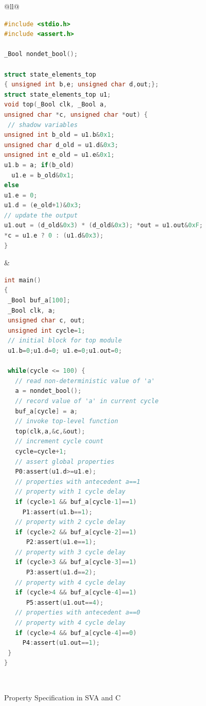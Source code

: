 \begin{figure}[bth]
\small
\begin{center}
\begin{tabular}{@{}ll@{}}
\hline\noalign{\vskip0.25ex}
 \\
\hline
\begin{lstlisting}[boxpos=t,mathescape=true,language=C,basicstyle=\scriptsize\ttfamily]
#include <stdio.h>
#include <assert.h>

_Bool nondet_bool(); 

struct state_elements_top 
{ unsigned int b,e; unsigned char d,out;};
struct state_elements_top u1;
void top(_Bool clk, _Bool a,
unsigned char *c, unsigned char *out) {
 // shadow variables
unsigned int b_old = u1.b&0x1; 
unsigned char d_old = u1.d&0x3; 
unsigned int e_old = u1.e&0x1;
u1.b = a; if(b_old)
  u1.e = b_old&0x1;
else
u1.e = 0;
u1.d = (e_old+1)&0x3;
// update the output
u1.out = (d_old&0x3) * (d_old&0x3); *out = u1.out&0xF;
*c = u1.e ? 0 : (u1.d&0x3);
}
\end{lstlisting}
& 
\begin{lstlisting}[boxpos=t,mathescape=true,language=C,basicstyle=\scriptsize\ttfamily]
int main() 
{
 _Bool buf_a[100];
 _Bool clk, a;
 unsigned char c, out;
 unsigned int cycle=1;
 // initial block for top module
 u1.b=0;u1.d=0; u1.e=0;u1.out=0; 
 
 while(cycle <= 100) {
   // read non-deterministic value of 'a'
   a = nondet_bool(); 
   // record value of 'a' in current cycle
   buf_a[cycle] = a;
   // invoke top-level function
   top(clk,a,&c,&out);
   // increment cycle count
   cycle=cycle+1; 
   // assert global properties 
   P0:assert(u1.d>=u1.e);
   // properties with antecedent a==1 
   // property with 1 cycle delay
   if (cycle>1 && buf_a[cycle-1]==1) 
     P1:assert(u1.b==1);
   // property with 2 cycle delay
   if (cycle>2 && buf_a[cycle-2]==1)
      P2:assert(u1.e==1); 
   // property with 3 cycle delay
   if (cycle>3 && buf_a[cycle-3]==1)
      P3:assert(u1.d==2); 
   // property with 4 cycle delay
   if (cycle>4 && buf_a[cycle-4]==1)
      P5:assert(u1.out==4); 
   // properties with antecedent a==0
   // property with 4 cycle delay
   if (cycle>4 && buf_a[cycle-4]==0) 
     P4:assert(u1.out==1);
 }
}
\end{lstlisting}\\
\hline
\end{tabular}
	\caption{Property Specification in SVA and C}
\label{fig:sva}
\end{center}
\end{figure}

